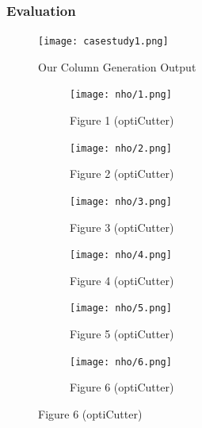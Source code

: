 \documentclass[a4paper]{article}
\begin{document}
\subsubsection*{Evaluation}
\begin{figure}[H]
    \centering
     \captionsetup{justification=centering, font=small} %
    \texttt{[image: casestudy1.png]}
    \vspace{0.4cm}
    \caption*{Our Column Generation Output}
     \label{fig:1}
\end{figure}
\begin{figure}[H] %
  \centering
  
  \begin{subfigure}[b]{0.48\textwidth}
    \centering
    \texttt{[image: nho/1.png]}
    \caption{Figure 1 (optiCutter)}
    \label{fig:1}
  \end{subfigure}
  \hfill
  \begin{subfigure}[b]{0.48\textwidth}
    \centering
    \texttt{[image: nho/2.png]}
    \caption{Figure 2 (optiCutter)}
    \label{fig:2}
  \end{subfigure}
  
  \vspace{0.3cm} %
  
  \begin{subfigure}[b]{0.48\textwidth}
    \centering
    \texttt{[image: nho/3.png]}
    \caption{Figure 3 (optiCutter)}
    \label{fig:3}
  \end{subfigure}
  \hfill
  \begin{subfigure}[b]{0.48\textwidth}
    \centering
    \texttt{[image: nho/4.png]}
    \caption{Figure 4 (optiCutter)}
    \label{fig:4}
  \end{subfigure}
  
  \vspace{0.3cm} %
  
  \begin{subfigure}[b]{0.48\textwidth}
    \centering
    \texttt{[image: nho/5.png]}
    \caption{Figure 5 (optiCutter)}
    \label{fig:5}
  \end{subfigure}
  \hfill
  \begin{subfigure}[b]{0.48\textwidth}
    \centering
    \texttt{[image: nho/6.png]}
    \caption{Figure 6 (optiCutter)}
    \label{fig:6}
  \end{subfigure}
                                                           
  \label{fig:all_images}
\end{figure}
\end{document}
